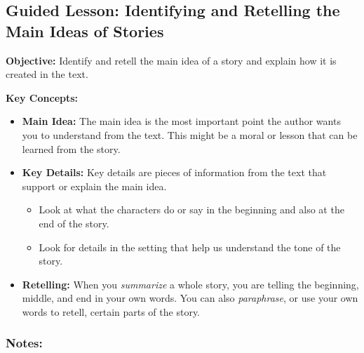 \documentclass[12pt]{article}
\title{}
\date{}
\begin{document}
\subsection*{Guided Lesson: Identifying and Retelling the Main Ideas of Stories}
\onehalfspacing

\begin{tcolorbox}[colframe=black!40, colback=gray!5, 
coltitle=black, colbacktitle=black!20, fonttitle=\bfseries\Large, 
title=Learning Objective, halign title=center, left=5pt, right=5pt, top=5pt, bottom=15pt]
\textbf{Objective:} Identify and retell the main idea of a story and explain how it is created in the text.
\end{tcolorbox}


\vspace{1em}

\begin{tcolorbox}[colframe=black!60, colback=white, 
coltitle=black, colbacktitle=black!15, fonttitle=\bfseries\Large, 
title=Key Concepts and Vocabulary, halign title=center, left=10pt, right=10pt, top=10pt, bottom=15pt]
\textbf{Key Concepts:}
\begin{itemize}
    \item \textbf{Main Idea:} The main idea is the most important point the author wants you to understand from the text. This might be a moral or lesson that can be learned from the story.
    \item \textbf{Key Details:} Key details are pieces of information from the text that support or explain the main idea. 
    \begin{itemize}
        \item Look at what the characters do or say in the beginning and also at the end of the story.
        \item Look for details in the setting that help us understand the tone of the story.
    \end{itemize}
    \item \textbf{Retelling:} When you \textit{summarize} a whole story, you are telling the beginning, middle, and end in your own words. You can also \textit{paraphrase}, or use your own words to retell, certain parts of the story.
\end{itemize}

\end{tcolorbox}

\vspace{1em}

\subsubsection*{Notes:}
\noindent \underline{\hspace{17cm}} \\[1.2cm]
\noindent \underline{\hspace{17cm}} \\[1.2cm]
\noindent \underline{\hspace{17cm}} \\[1.2cm]
\end{document}

